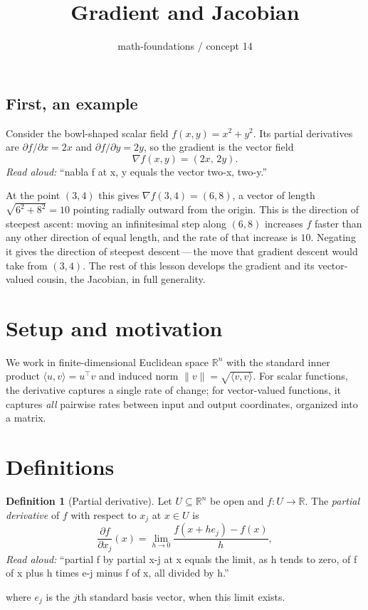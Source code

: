\documentclass[11pt]{article}
\title{Gradient and Jacobian}
\author{math-foundations / concept 14}
\date{}
\theoremstyle{definition}
\newtheorem{definition}{Definition}
\begin{document}
\maketitle

\subsection*{First, an example}
Consider the bowl-shaped scalar field $f(x, y) = x^2 + y^2$. Its partial
derivatives are $\partial f/\partial x = 2x$ and $\partial f/\partial y = 2y$,
so the gradient is the vector field
\[
\nabla f(x, y) = (2x,\, 2y).
\]
\emph{Read aloud:} ``nabla f at x, y equals the vector two-x, two-y.''

At the point $(3, 4)$ this gives $\nabla f(3, 4) = (6, 8)$, a vector of
length $\sqrt{6^2 + 8^2} = 10$ pointing radially outward from the origin.
This is the direction of steepest ascent: moving an infinitesimal step
along $(6, 8)$ increases $f$ faster than any other direction of equal
length, and the rate of that increase is $10$. Negating it gives the
direction of steepest descent\,---\,the move that gradient descent would
take from $(3, 4)$. The rest of this lesson develops the gradient and its
vector-valued cousin, the Jacobian, in full generality.

\section{Setup and motivation}

We work in finite-dimensional Euclidean space $\mathbb{R}^n$ with the standard
inner product $\langle u, v\rangle = u^\top v$ and induced norm
$\|v\| = \sqrt{\langle v, v\rangle}$. For scalar functions, the derivative
captures a single rate of change; for vector-valued functions, it captures
\emph{all} pairwise rates between input and output coordinates, organized
into a matrix.

\section{Definitions}

\begin{definition}[Partial derivative]
Let $U \subseteq \mathbb{R}^n$ be open and $f : U \to \mathbb{R}$. The
\emph{partial derivative} of $f$ with respect to $x_j$ at $x \in U$ is
\[
\frac{\partial f}{\partial x_j}(x)
   = \lim_{h \to 0} \frac{f(x + h e_j) - f(x)}{h},
\]
\emph{Read aloud:} ``partial f by partial x-j at x equals the limit, as h tends to zero, of f of x plus h times e-j minus f of x, all divided by h.''

where $e_j$ is the $j$th standard basis vector, when this limit exists.
\end{definition}
\end{document}
